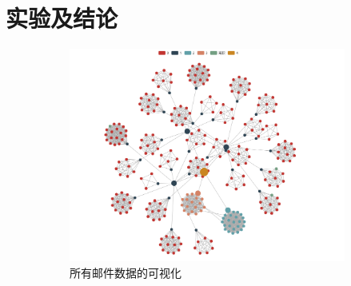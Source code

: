 \documentclass[journal]{vgtc}                %
\begin{document}
\section{实验及结论}
\begin{figure}
	\centering
	\begin{subfigure}{\linewidth} %
		\includegraphics[width=\textwidth]{pictures/5-1.png}
		\caption{所有邮件数据的可视化} %
		\label{fig:all_category}
	\end{subfigure}
	\begin{subfigure}{0.3\linewidth} 

\end{subfigure}
\end{figure}
\end{document}
